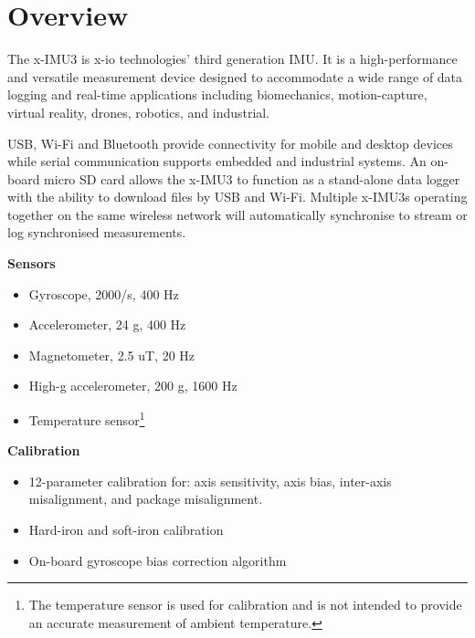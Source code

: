 \section{Overview}

\begin{multicols}{2}

The x-IMU3 is x-io technologies' third generation \ac{IMU}.  It is a high-performance and versatile measurement device designed to accommodate a wide range of data logging and real-time applications including biomechanics, motion-capture, virtual reality, drones, robotics, and industrial.

\acs{USB}, Wi-Fi and Bluetooth provide connectivity for mobile and desktop devices while serial communication supports embedded and industrial systems.  An on-board micro \acs{SD} card allows the x-IMU3 to function as a stand-alone data logger with the ability to download files by USB and Wi-Fi.  Multiple x-IMU3s operating together on the same wireless network will automatically synchronise to stream or log synchronised measurements.

\textbf{Sensors}
\begin{itemize}[nolistsep]
    \item Gyroscope, \textpm{}2000\textdegree{}/s, 400 Hz
    \item Accelerometer, \textpm{}24 g, 400 Hz
    \item Magnetometer, \textpm{}2.5 uT, 20 Hz
    \item High-g accelerometer, \textpm{}200 g, 1600 Hz
    \item Temperature sensor\footnote{The temperature sensor is used for calibration and is not intended to provide an accurate measurement of ambient temperature.}
\end{itemize}

\textbf{Calibration}
\begin{itemize}[nolistsep]
    \item 12-parameter calibration for: axis sensitivity, axis bias, inter-axis misalignment, and package misalignment.
    \item Hard-iron and soft-iron calibration
    \item On-board gyroscope bias correction algorithm
\end{itemize}


\end{multicols}
